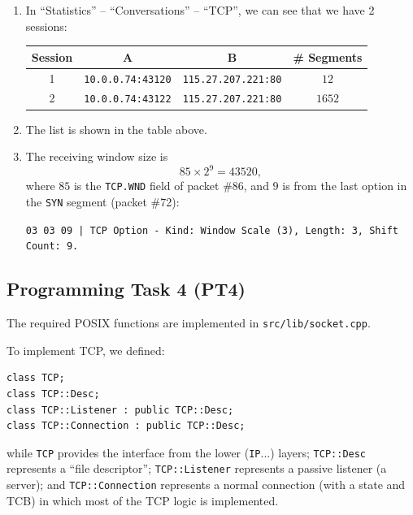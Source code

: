 \documentclass[a4paper]{article}
\begin{document}
  \begin{enumerate}
    \item In ``Statistics'' -- ``Conversations'' -- ``TCP'', we can see that we have 2 sessions:
    \begin{center}
      \begin{tabular}{c|ccc}
        \toprule
        Session & A & B & \# Segments \\
        \midrule
        1 & \texttt{10.0.0.74:43120} & \texttt{115.27.207.221:80} & $12$ \\
        2 & \texttt{10.0.0.74:43122} & \texttt{115.27.207.221:80} & $1652$ \\
        \bottomrule
      \end{tabular}
    \end{center}

    \item The list is shown in the table above.
    \item The receiving window size is
      $$85 \times 2^9 = 43520,$$
      where $85$ is the \texttt{TCP.WND} field of packet \#86, and $9$ is from the last option in the \texttt{SYN} segment (packet \#72):
      \begin{center}
        \texttt{03 03 09 | TCP Option - Kind: Window Scale (3), Length: 3, Shift Count: 9.}
      \end{center}
  \end{enumerate}

  \subsection{Programming Task 4 (PT4)}

  The required POSIX functions are implemented in \texttt{src/lib/socket.cpp}.

  To implement TCP, we defined:
  \begin{verbatim}
class TCP;
class TCP::Desc;
class TCP::Listener : public TCP::Desc;
class TCP::Connection : public TCP::Desc;
  \end{verbatim}
  while \texttt{TCP} provides the interface from the lower (\texttt{IP}...) layers;
  \texttt{TCP::Desc} represents a ``file descriptor'';
  \texttt{TCP::Listener} represents a passive listener (a server);
  and \texttt{TCP::Connection} represents a normal connection (with a state and TCB) in which most of the TCP logic is implemented.
\end{document}
